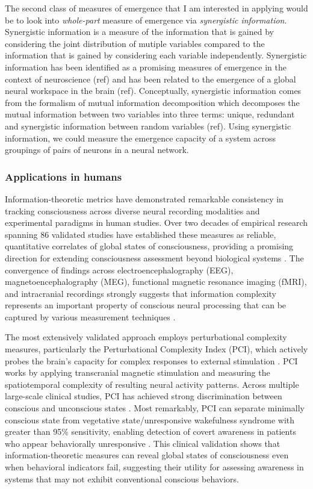 \documentclass[11pt,a4paper]{article}
\begin{document}
The second class of measures of emergence that I am interested in applying would be to look into \textit{whole-part} measure of emergence via \textit{synergistic information}. Synergistic information is a measure of the information that is gained by considering the joint distribution of mutiple variables compared to the information that is gained by considering each variable independently. Synergistic information has been identified as a promising measures of emergence in the context of neuroscience (ref) and has been related to the emergence of a global neural workspace in the brain (ref). Conceptually, synergistic information comes from the formalism of mutual information decomposition which decomposes the mutual information between two variables into three terms: unique, redundant and synergistic information between random variables (ref). Using synergistic information, we could measure the emergence capacity of a system across groupings of pairs of neurons in a neural network.

\subsubsection{Applications in humans}

Information-theoretic metrics have demonstrated remarkable consistency in tracking consciousness across diverse neural recording modalities and experimental paradigms in human studies. Over two decades of empirical research spanning 86 validated studies have established these measures as reliable, quantitative correlates of global states of consciousness, providing a promising direction for extending consciousness assessment beyond biological systems \citep{Casali2013, Schartner2015, Sarasso2021}. The convergence of findings across electroencephalography (EEG), magnetoencephalography (MEG), functional magnetic resonance imaging (fMRI), and intracranial recordings strongly suggests that information complexity represents an important property of conscious neural processing that can be captured by various measurement techniques \citep{Zhang2001, Liu2019, Luppi2022}.

The most extensively validated approach employs perturbational complexity measures, particularly the Perturbational Complexity Index (PCI), which actively probes the brain's capacity for complex responses to external stimulation \citep{Casali2013, Casarotto2016}. PCI works by applying transcranial magnetic stimulation and measuring the spatiotemporal complexity of resulting neural activity patterns. Across multiple large-scale clinical studies, PCI has achieved strong discrimination between conscious and unconscious states \citep{Sarasso2015, Casarotto2016}. Most remarkably, PCI can separate minimally conscious state from vegetative state/unresponsive wakefulness syndrome with greater than 95\% sensitivity, enabling detection of covert awareness in patients who appear behaviorally unresponsive \citep{Casarotto2016}. This clinical validation shows that information-theoretic measures can reveal global states of consciousness even when behavioral indicators fail, suggesting their utility for assessing awareness in systems that may not exhibit conventional conscious behaviors.
\end{document}
